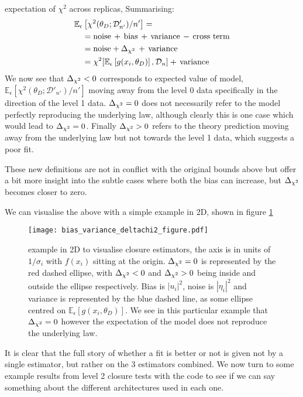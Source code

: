 expectation of $\chi^2$ across replicas, Summarising:
%
\begin{align}
    &\mathbb{E}_{\epsilon}\left[\chi^2(\theta_D; \mathcal{D}'_{n'})/n'\right] = \nonumber \\
    & \quad = \mathrm{noise} \, + \, \mathrm{bias} \, + \, \mathrm{variance} \, - \, \mathrm{cross \ term} \\
    & \quad = \mathrm{noise} + \Delta_{\chi^{2}} \, + \, \mathrm{variance} \\
    & \quad = \chi^2[\mathbb{E}_{\epsilon}\left[g(x_i,\theta_D)\right], \mathcal{D}_n] + \, \mathrm{variance}
\end{align}
%
We now see that $\Delta_{\chi^{2}} < 0$
corresponds to expected value of model,
$\mathbb{E}_{\epsilon}\left[\chi^2(\theta_D; \mathcal{D}'_{n'})/n'\right]$
moving away from the level 0 data specifically in the direction of the level 1
data. $\Delta_{\chi^{2}} = 0$ does not necessarily refer to the model perfectly reproducing the underlying law,
although clearly this is one case which would lead to $\Delta_{\chi^{2}}=0$.
Finally $\Delta_{\chi^{2}} > 0$ refers to the theory prediction moving
away from the underlying law but not towards the level 1 data, which suggests a
poor fit. 

These new definitions are not in conflict with the original bounds above but
offer a bit more insight into the subtle cases where both the bias can increase,
but $\Delta_{\chi^{2}}$ becomes closer to zero.

We can visualise the above with a simple example in 2D, shown in figure
\ref{fig:vectorexample}
\newpage
%
\begin{figure}[!h]
    \centering
    \texttt{[image: bias\_variance\_deltachi2\_figure.pdf]}
    \caption{example in 2D to visualise closure estimators, the axis
    is in units of $1/\sigma_{i}$ with $f(x_i)$ sitting at the origin.
    $\Delta_{\chi^{2}}=0$ is represented by the red dashed
    ellipse, with $\Delta_{\chi^{2}} < 0$ and $\Delta_{\chi^{2}} > 0$ being inside and outside the ellipse
    respectively. Bias is $|u_i|^2$, noise is $|\eta_i|^2$ and variance is
    represented by the blue dashed line, as some ellipse centred on
    $\mathbb{E}_{\epsilon}\left[ g(x_i, \theta_D)\right]$. We see in this
    particular example that $\Delta_{\chi^{2}}=0$ however the expectation of the model does
    not reproduce the underlying law.}
    \label{fig:vectorexample}
\end{figure}
%

It is clear that the full story of whether a fit is better or not is given not
by a single estimator, but rather on the 3 estimators combined. We now turn to
some example results from level 2 closure tests with the \nfit code to see if we
can say something about the different architectures used in each one.

